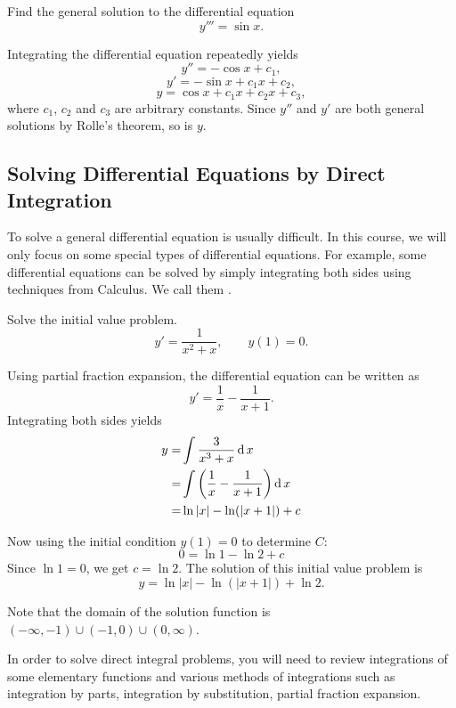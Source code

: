 \begin{exercise}
  Find the general solution to the differential equation
  $$
    y'''= \sin x.
  $$
\end{exercise}

\begin{exersol}
  Integrating the differential equation repeatedly yields
  $$y''=-\cos x + c_1,$$
  $$y'=-\sin x + c_1x + c_2,$$
  $$y=\cos x + c_1x + c_2x + c_3,$$
  where $c_1$, $c_2$ and $c_3$ are arbitrary constants. Since $y''$ and $y'$ are both general solutions by Rolle's theorem, so is $y$.
\end{exersol}

\subsection{Solving Differential Equations by Direct Integration}

To solve a general differential equation is usually difficult. In this course, we will only focus on some special types of differential equations. For example, some differential equations can be solved by simply integrating both sides using techniques from Calculus. We call them .

\begin{example} 
  Solve the initial value problem.
  $$y'= \frac{1}{x^2+x}, \qquad y(1)=0.$$
	\end{example}
\begin{solution}
  Using partial fraction expansion, the differential equation can be written as
  $$y'=\frac1x-\frac1{x+1}.$$
Integrating both sides yields
$$\begin{aligned}
  y=&\int \frac{3}{x^3+x} \operatorname{d} x \\
  =&\int \left(\frac{1}{x}-\frac{1}{x+1}\right) \operatorname{d} x\\ 
  =& \ln |x| - \ln(|x+1|) + c 
\end{aligned}
$$

Now using the initial condition $ y(1)=0$ to determine $C$:
$$0= \ln 1 - \ln 2 + c$$
Since $\ln 1=0$, we get $c= \ln 2$. 
The solution of this initial value problem is
$$y = \ln|x| - \ln(|x+1|) + \ln 2.$$

Note that the domain of the solution function is $(-\infty, -1)\cup (-1,0)\cup (0, \infty)$.
\end{solution}

In order to solve direct integral problems, you will need to review integrations of some elementary functions and various methods of integrations such as integration by parts, integration by substitution, partial fraction expansion.

